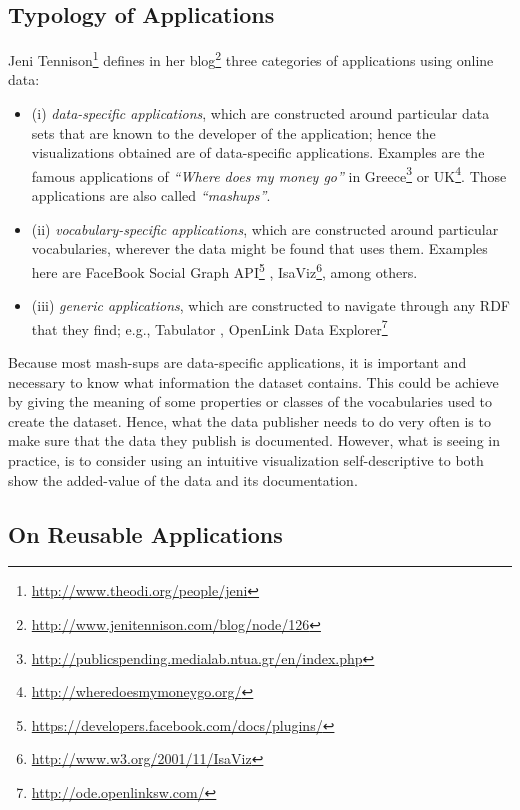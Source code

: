 \subsection{Typology of Applications}
Jeni Tennison\footnote{\url{http://www.theodi.org/people/jeni}} defines  in her blog\footnote{\url{http://www.jenitennison.com/blog/node/126}} three categories of applications using online data:
\begin{itemize}
\item (i) \textit{data-specific applications}, which are constructed around particular data sets that are known to the developer of the application; hence the visualizations obtained are of data-specific applications. Examples are the famous applications of \textit{``Where does my money go''}  in Greece\footnote{\url{http://publicspending.medialab.ntua.gr/en/index.php}} or UK\footnote{\url{http://wheredoesmymoneygo.org/}}. Those applications are also called \textit{``mashups''}. 
\item (ii) \textit{vocabulary-specific applications}, which are constructed around particular vocabularies, wherever the data might be found that uses them. Examples here are FaceBook Social Graph API\footnote{\url{https://developers.facebook.com/docs/plugins/}} , IsaViz\footnote{\url{http://www.w3.org/2001/11/IsaViz}}, among others.
\item (iii) \textit{generic applications}, which are constructed to navigate through any RDF that they find; e.g., Tabulator \cite{tabulator06}, OpenLink Data Explorer\footnote{\url{http://ode.openlinksw.com/}}

\end{itemize}
Because most mash-sups are data-specific applications, it is important and necessary to  know what information the dataset contains. This could be achieve by giving the meaning of some properties or classes of the vocabularies used to create the dataset. Hence, what the data publisher needs to do very often is to make sure that the data they publish is documented. However, what is seeing in practice, is to consider using an intuitive visualization self-descriptive to both show the added-value of the data and its documentation.


\subsection{On Reusable Applications} \label{sec:reusable}

